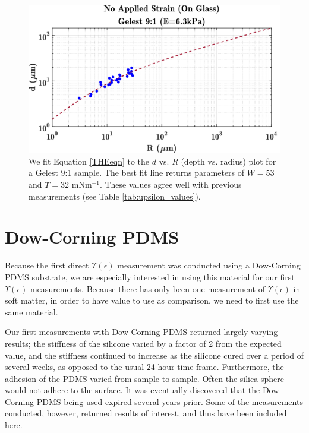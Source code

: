 \begin{figure}[h!]
	\centering
	\includegraphics[width=\linewidth]{Chapters/Figures/w_ups_fit_G9-1}
	\caption[Gelest W-$\Upsilon$ Fit]{We fit Equation \ref{THEeqn} to the $ d $ vs. $ R $ (depth vs. radius) plot for a Gelest 9:1 sample. The best fit line returns parameters of $ W=53 $  and $ \Upsilon=32 $ mNm$^{-1}$. These values agree well with previous measurements (see Table \ref{tab:upsilon_values}).}
	\label{fig:wupsfitg9-1}
\end{figure}

\section{Dow-Corning PDMS}
Because the first direct $ \Upsilon(\epsilon) $ measurement \cite{xu2017direct} was conducted using a Dow-Corning PDMS substrate, we are especially interested in using this material for our first $ \Upsilon(\epsilon) $ measurements. Because there has only been one measurement of $ \Upsilon(\epsilon) $ in soft matter, in order to have value to use as comparison, we need to first use the same material. 

Our first measurements with Dow-Corning PDMS returned largely varying results; the stiffness of the silicone varied by a factor of 2 from the expected value, and the stiffness continued to increase as the silicone cured over a period of several weeks, as opposed to the usual 24 hour time-frame. Furthermore, the adhesion of the PDMS varied from sample to sample. Often the silica sphere would not adhere to the surface. It was eventually discovered that the Dow-Corning PDMS being used expired several years prior. Some of the measurements conducted, however, returned results of interest, and thus have been included here.


